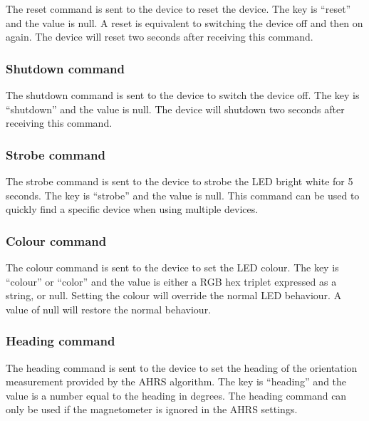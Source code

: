 The reset command is sent to the device to reset the device.  The key is \enquote{reset} and the value is null.  A reset is equivalent to switching the device off and then on again.  The device will reset two seconds after receiving this command.


\subsubsection{Shutdown command}

The shutdown command is sent to the device to switch the device off.  The key is \enquote{shutdown} and the value is null.  The device will shutdown two seconds after receiving this command.


\subsubsection{Strobe command}
\label{sec:strobeCommand}

The strobe command is sent to the device to strobe the \ac{LED} bright white for 5 seconds.  The key is \enquote{strobe} and the value is null.  This command can be used to quickly find a specific device when using multiple devices.


\subsubsection{Colour command}
\label{sec:colourCommand}

The colour command is sent to the device to set the \ac{LED} colour.  The key is \enquote{colour} or \enquote{color} and the value is either a \ac{RGB} hex triplet expressed as a string, or null.  Setting the colour will override the normal \ac{LED} behaviour.  A value of null will restore the normal behaviour.


\subsubsection{Heading command}
\label{sec:colourCommand}

The heading command is sent to the device to set the heading of the orientation measurement provided by the \ac{AHRS} algorithm.  The key is \enquote{heading} and the value is a number equal to the heading in degrees.  The heading command can only be used if the magnetometer is ignored in the \ac{AHRS} settings.

